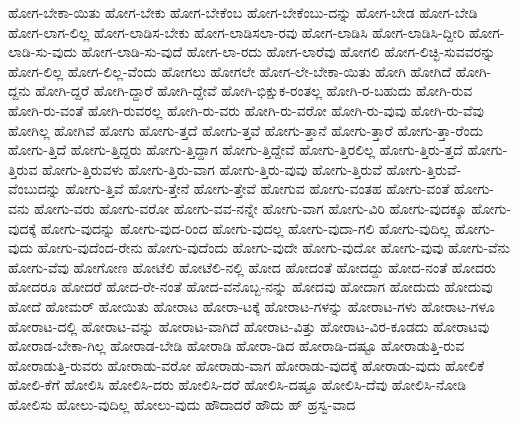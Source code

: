 {ಹೋಗ-ಬೇಕಾ-ಯಿತು
ಹೋಗ-ಬೇಕು
ಹೋಗ-ಬೇಕೆಂಬ
ಹೋಗ-ಬೇಕೆಂಬು-ದನ್ನು
ಹೋಗ-ಬೇಡ
ಹೋಗ-ಬೇಡಿ
ಹೋಗ-ಲಾಗ-ಲಿಲ್ಲ
ಹೋಗ-ಲಾಡಿಸ-ಬೇಕು
ಹೋಗ-ಲಾಡಿಸಲಾ-ರವು
ಹೋಗ-ಲಾಡಿಸಿ
ಹೋಗ-ಲಾಡಿಸಿ-ದ್ದೀರಿ
ಹೋಗ-ಲಾಡಿ-ಸು-ವುದು
ಹೋಗ-ಲಾಡಿ-ಸು-ವುದೆ
ಹೋಗ-ಲಾ-ರದು
ಹೋಗ-ಲಾರೆವು
ಹೋಗಲಿ
ಹೋಗ-ಲಿಚ್ಛಿ-ಸುವವರನ್ನು
ಹೋಗ-ಲಿಲ್ಲ
ಹೋಗ-ಲಿಲ್ಲ-ವೆಂದು
ಹೋಗಲು
ಹೋಗಲೇ
ಹೋಗ-ಲೇ-ಬೇಕಾ-ಯಿತು
ಹೋಗಿ
ಹೋಗಿದೆ
ಹೋಗಿ-ದ್ದನು
ಹೋಗಿ-ದ್ದರೆ
ಹೋಗಿ-ದ್ದಾರೆ
ಹೋಗಿ-ದ್ದೇವೆ
ಹೋಗಿ-ಭಿಕ್ಷುಕ-ರಂತಲ್ಲ
ಹೋಗಿ-ರ-ಬಹುದು
ಹೋಗಿ-ರುವ
ಹೋಗಿ-ರು-ವಂತೆ
ಹೋಗಿ-ರುವರಲ್ಲ
ಹೋಗಿ-ರು-ವರು
ಹೋಗಿ-ರು-ವರೋ
ಹೋಗಿ-ರು-ವುವು
ಹೋಗಿ-ರು-ವೆವು
ಹೋಗಿಲ್ಲ
ಹೋಗಿವೆ
ಹೋಗು
ಹೋಗು-ತ್ತದೆ
ಹೋಗು-ತ್ತವೆ
ಹೋಗು-ತ್ತಾನೆ
ಹೋಗು-ತ್ತಾರೆ
ಹೋಗು-ತ್ತಾ-ರೆಂದು
ಹೋಗು-ತ್ತಿದೆ
ಹೋಗು-ತ್ತಿದ್ದರು
ಹೋಗು-ತ್ತಿದ್ದಾಗ
ಹೋಗು-ತ್ತಿದ್ದೇವೆ
ಹೋಗು-ತ್ತಿರಲಿಲ್ಲ
ಹೋಗು-ತ್ತಿರು-ತ್ತದೆ
ಹೋಗು-ತ್ತಿರುವ
ಹೋಗು-ತ್ತಿರುವಳು
ಹೋಗು-ತ್ತಿರು-ವಾಗ
ಹೋಗು-ತ್ತಿರು-ವುವು
ಹೋಗು-ತ್ತಿರುವೆ
ಹೋಗು-ತ್ತಿರುವೆ-ವೆಂಬುದನ್ನು
ಹೋಗು-ತ್ತಿವೆ
ಹೋಗು-ತ್ತೇನೆ
ಹೋಗು-ತ್ತೇವೆ
ಹೋಗುವ
ಹೋಗು-ವಂತಹ
ಹೋಗು-ವಂತೆ
ಹೋಗು-ವನು
ಹೋಗು-ವರು
ಹೋಗು-ವರೋ
ಹೋಗು-ವವ-ನನ್ನೇ
ಹೋಗು-ವಾಗ
ಹೋಗು-ವಿರಿ
ಹೋಗು-ವುದಕ್ಕೂ
ಹೋಗು-ವುದಕ್ಕೆ
ಹೋಗು-ವುದನ್ನು
ಹೋಗು-ವುದ-ರಿಂದ
ಹೋಗು-ವುದಲ್ಲ
ಹೋಗು-ವುದಾ-ಗಲಿ
ಹೋಗು-ವುದಿಲ್ಲ
ಹೋಗು-ವುದು
ಹೋಗು-ವುದೆಂದ-ರೇನು
ಹೋಗು-ವುದೆಂದು
ಹೋಗು-ವುದೇ
ಹೋಗು-ವುದೋ
ಹೋಗು-ವುವು
ಹೋಗು-ವೆನು
ಹೋಗು-ವೆವು
ಹೋಗೋಣ
ಹೋಟೆಲಿ
ಹೋಟೆಲಿ-ನಲ್ಲಿ
ಹೋದ
ಹೋದಂತೆ
ಹೋದದ್ದು
ಹೋದ-ನಂತೆ
ಹೋದರು
ಹೋದರೂ
ಹೋದರೆ
ಹೋದ-ರೇ-ನಂತೆ
ಹೋದ-ವನೊಬ್ಬ-ನನ್ನು
ಹೋದವು
ಹೋದಾಗ
ಹೋದುದು
ಹೋದುವು
ಹೋದೆ
ಹೋಮರ್
ಹೋಯಿತು
ಹೋರಾಟ
ಹೋರಾ-ಟಕ್ಕೆ
ಹೋರಾಟ-ಗಳನ್ನು
ಹೋರಾಟ-ಗಳು
ಹೋರಾಟ-ಗಳೂ
ಹೋರಾಟ-ದಲ್ಲಿ
ಹೋರಾಟ-ವನ್ನು
ಹೋರಾಟ-ವಾಗಿದೆ
ಹೋರಾಟ-ವಿತ್ತು
ಹೋರಾಟ-ವಿರ-ಕೂಡದು
ಹೋರಾಟವು
ಹೋರಾಡ-ಬೇಕಾ-ಗಿಲ್ಲ
ಹೋರಾಡ-ಬೇಡಿ
ಹೋರಾಡಿ
ಹೋರಾ-ಡಿದ
ಹೋರಾಡಿ-ದಷ್ಟೂ
ಹೋರಾಡುತ್ತಿ-ರುವ
ಹೋರಾಡುತ್ತಿ-ರುವರು
ಹೋರಾಡು-ವರೋ
ಹೋರಾಡು-ವಾಗ
ಹೋರಾಡು-ವುದಕ್ಕೆ
ಹೋರಾಡು-ವುದು
ಹೋಲಿಕೆ
ಹೋಲಿ-ಕೆಗೆ
ಹೋಲಿಸಿ
ಹೋಲಿಸಿ-ದರು
ಹೋಲಿಸಿ-ದರೆ
ಹೋಲಿಸಿ-ದಷ್ಟೂ
ಹೋಲಿಸಿ-ದೆವು
ಹೋಲಿಸಿ-ನೋಡಿ
ಹೋಲಿಸು
ಹೋಲು-ವುದಿಲ್ಲ
ಹೋಲು-ವುದು
ಹೌದಾದರೆ
ಹೌದು
ಹ್
ಹ್ರಸ್ವ-ವಾದ
}
